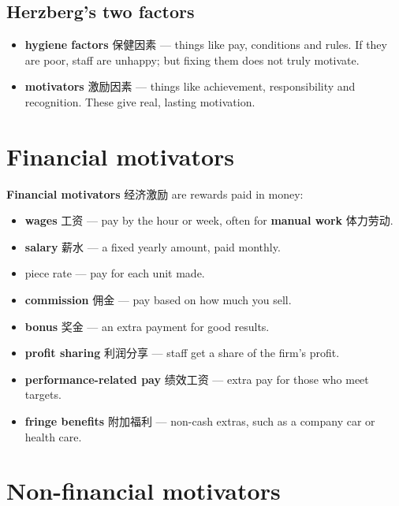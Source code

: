 \documentclass[11pt]{article}
\begin{document}
\subsection*{Herzberg's two factors}

\begin{itemize}
\item \textbf{hygiene factors} 保健因素 — things like pay, conditions and rules. If they are poor, staff are unhappy; but fixing them does not truly motivate.

\item \textbf{motivators} 激励因素 — things like achievement, responsibility and recognition. These give real, lasting motivation.

\end{itemize}

\section*{Financial motivators}

\textbf{Financial motivators} 经济激励 are rewards paid in money:

\begin{itemize}
\item \textbf{wages} 工资 — pay by the hour or week, often for \textbf{manual work} 体力劳动.

\item \textbf{salary} 薪水 — a fixed yearly amount, paid monthly.

\item piece rate — pay for each unit made.

\item \textbf{commission} 佣金 — pay based on how much you sell.

\item \textbf{bonus} 奖金 — an extra payment for good results.

\item \textbf{profit sharing} 利润分享 — staff get a share of the firm's profit.

\item \textbf{performance-related pay} 绩效工资 — extra pay for those who meet targets.

\item \textbf{fringe benefits} 附加福利 — non-cash extras, such as a company car or health care.

\end{itemize}

\section*{Non-financial motivators}
\end{document}
